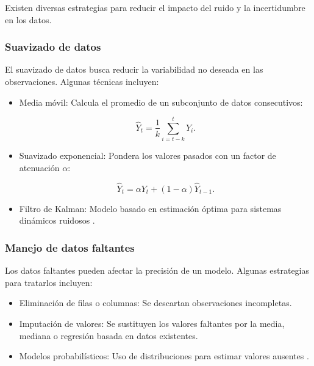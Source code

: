 \begin{itemize}
		Existen diversas estrategias para reducir el impacto del ruido y la incertidumbre en los datos.
		
		\subsubsection{Suavizado de datos}
		
		El suavizado de datos busca reducir la variabilidad no deseada en las observaciones. Algunas técnicas incluyen:
		
		\begin{itemize}
			\item Media móvil: Calcula el promedio de un subconjunto de datos consecutivos:
			
			\begin{equation}
				\hat{Y}_t = \frac{1}{k} \sum_{i=t-k}^{t} Y_i.
			\end{equation}
			
			\item Suavizado exponencial: Pondera los valores pasados con un factor de atenuación \( \alpha \):
			
			\begin{equation}
				\hat{Y}_t = \alpha Y_t + (1 - \alpha) \hat{Y}_{t-1}.
			\end{equation}
			
			\item Filtro de Kalman: Modelo basado en estimación óptima para sistemas dinámicos ruidosos \cite{kalman1960new}.
		\end{itemize}
		
		\subsubsection{Manejo de datos faltantes}
		
		Los datos faltantes pueden afectar la precisión de un modelo. Algunas estrategias para tratarlos incluyen:
		
		\begin{itemize}
			\item Eliminación de filas o columnas: Se descartan observaciones incompletas.
			\item Imputación de valores: Se sustituyen los valores faltantes por la media, mediana o regresión basada en datos existentes.
			\item Modelos probabilísticos: Uso de distribuciones para estimar valores ausentes \cite{little2019statistical}.
		\end{itemize}
		

\end{itemize}
